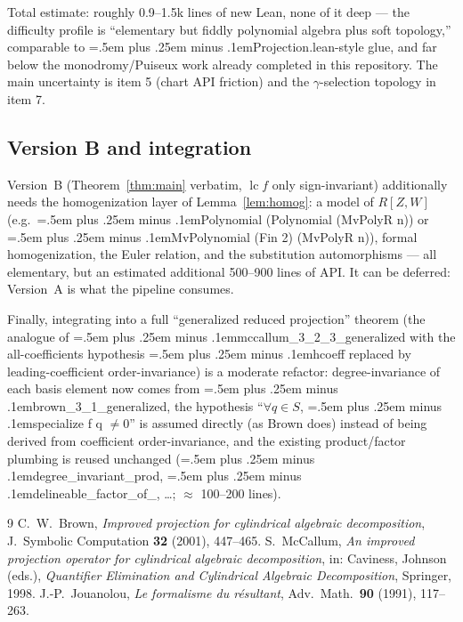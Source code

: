 \documentclass[11pt,a4paper]{article}
\theoremstyle{definition}
\newcommand{\lc}{\operatorname{lc}}
\newcommand{\code}[1]{{\ttfamily\spaceskip=.5em plus .25em minus .1em\relax #1}}
\begin{document}
Total estimate: roughly 0.9--1.5k lines of new Lean, none of it deep --- the
difficulty profile is ``elementary but fiddly polynomial algebra plus soft
topology,'' comparable to \code{Projection.lean}-style glue, and far below the
monodromy/Puiseux work already completed in this repository. The main
uncertainty is item 5 (chart API friction) and the $\gamma$-selection
topology in item 7.

\subsection*{Version B and integration}

Version~B (Theorem~\ref{thm:main} verbatim, $\lc f$ only sign-invariant)
additionally needs the homogenization layer of Lemma~\ref{lem:homog}: a model
of $R[Z,W]$ (e.g.\ \code{Polynomial (Polynomial (MvPolyR n))} or
\code{MvPolynomial (Fin 2) (MvPolyR n)}), formal homogenization, the Euler
relation, and the substitution automorphisms --- all elementary, but an
estimated additional 500--900 lines of API. It can be deferred: Version~A is
what the pipeline consumes.

Finally, integrating into a full ``generalized reduced projection'' theorem
(the analogue of \code{mccallum\_3\_2\_3\_generalized} with the
all-coefficients hypothesis \code{hcoeff} replaced by leading-coefficient
order-invariance) is a moderate refactor: degree-invariance of each basis
element now comes from \code{brown\_3\_1\_generalized}, the hypothesis
``$\forall q \in S$, \code{specialize f q} $\neq 0$'' is assumed directly (as Brown
does) instead of being derived from coefficient order-invariance, and the
existing product/factor plumbing is reused unchanged
(\code{degree\_invariant\_prod},
\code{delineable\_factor\_of\_}\allowbreak\code{delineable\_prod}, \dots;
$\approx$ 100--200 lines).

\begin{thebibliography}{9}
 C.~W.~Brown,
  \emph{Improved projection for cylindrical algebraic decomposition},
  J.~Symbolic Computation \textbf{32} (2001), 447--465.
 S.~McCallum,
  \emph{An improved projection operator for cylindrical algebraic
  decomposition}, in: Caviness, Johnson (eds.), \emph{Quantifier Elimination
  and Cylindrical Algebraic Decomposition}, Springer, 1998.
 J.-P.~Jouanolou,
  \emph{Le formalisme du r\'esultant}, Adv.\ Math.\ \textbf{90} (1991),
  117--263.
\end{thebibliography}
\end{document}
